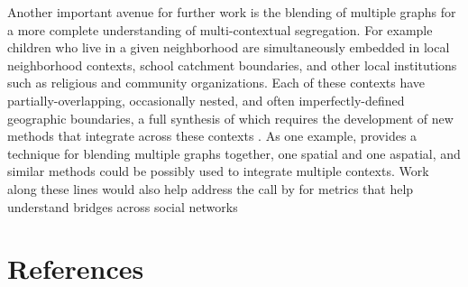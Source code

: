 \documentclass[
  10pt,
]{article}
\begin{document}
Another important avenue for further work is the blending of multiple
graphs for a more complete understanding of multi-contextual
segregation. For example children who live in a given neighborhood are
simultaneously embedded in local neighborhood contexts, school catchment
boundaries, and other local institutions such as religious and community
organizations. Each of these contexts have partially-overlapping,
occasionally nested, and often imperfectly-defined geographic
boundaries, a full synthesis of which requires the development of new
methods that integrate across these contexts
\citep{galster2001NatureNeighbourhood, galster2019making}. As one
example, \citet{wolf2021SpatiallyEncouraged} provides a technique for
blending multiple graphs together, one spatial and one aspatial, and
similar methods could be possibly used to integrate multiple contexts.
Work along these lines would also help address the call by
\citet[p.~156]{reardon2004MeasuresSpatial} for metrics that help
understand bridges across social networks

\hypertarget{references}{%
\section{References}\label{references}}


  
\end{document}

